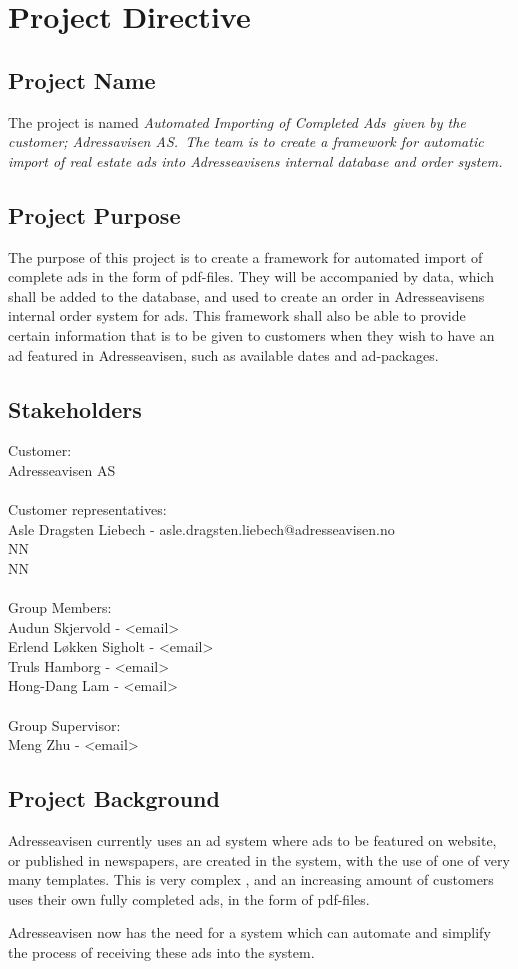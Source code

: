 \documentclass[12pt, a4paper]{article}
\begin{document}
\section{Project Directive}

\subsection{Project Name}
The project is named \em Automated Importing of Completed Ads\em \ given by the \\
customer; \em Adressavisen AS.\em \ The team is to create a framework for automatic import of real estate ads
into Adresseavisens internal database and order system.

\subsection{Project Purpose}
The purpose of this project is to create a framework for automated import of complete ads in the form of pdf-files. They will be accompanied by data, which shall be added to the database, and used to create an order in Adresseavisens internal order system for ads. This framework shall also be able to provide certain information that is to be given to customers when they wish to have an ad featured in Adresseavisen, such as available dates and ad-packages.

\subsection{Stakeholders}

Customer:\\
Adresseavisen AS\\
\\
Customer representatives:\\
Asle Dragsten Liebech - asle.dragsten.liebech@adresseavisen.no\\
NN\\
NN\\
\\
Group Members:\\
Audun Skjervold - <email>\\
Erlend Løkken Sigholt - <email>\\
Truls Hamborg - <email>\\
Hong-Dang Lam - <email>\\
\\
Group Supervisor:\\
Meng Zhu - <email>
\\

\subsection{Project Background}
Adresseavisen currently uses an ad system where ads to be featured on website, or published in newspapers, are created in the system, with the use of one of very many templates. This is very complex , and an increasing amount of customers uses their own fully completed ads, in the form of pdf-files. 

Adresseavisen now has the need for a system which can automate and simplify the process of receiving these ads into the system.
\end{document}
